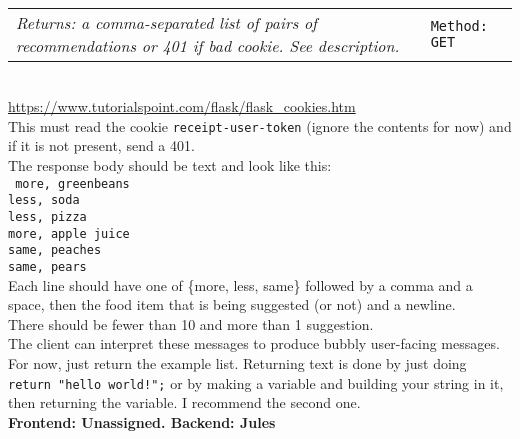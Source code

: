 \documentclass[12pt,letterpaper]{article}
\newcommand{\customendpoint}[4]{\bigbreak {\Large\textbf{#1}(#2)}\\%
\begin{tabular}{p{8cm}|p{8cm}}\textit{Returns: #3}&\texttt{Method: #4}\end{tabular}\\}
\begin{document}
\customendpoint{getreqs}{\textit{\tiny none}}
{a comma-separated list of pairs of recommendations or 401 if bad cookie. 
See description.}{GET}
\url{https://www.tutorialspoint.com/flask/flask_cookies.htm}\\
This must read the cookie \texttt{receipt-user-token} (ignore the contents
for now) and if it is not present, send a 401.\\
The response body should be text and look like this:
\\\texttt{
	more, greenbeans\\
	less, soda\\
	less, pizza\\
	more, apple juice\\
	same, peaches\\
	same, pears\\
	}
Each line should have one of \{more, less, same\} followed by a comma
and a space, then the food item that is being suggested (or not) and a newline.\\
There should be fewer than 10 and more than 1 suggestion.\\
The client can interpret these messages to produce bubbly user-facing messages.\\
For now, just return the example list.
Returning text is done by just doing \texttt{return "hello world!";} or
by making a variable and building your string in it, then returning the
variable. I recommend the second one.\\
\textbf{Frontend: Unassigned. Backend: Jules}\\
\end{document}
